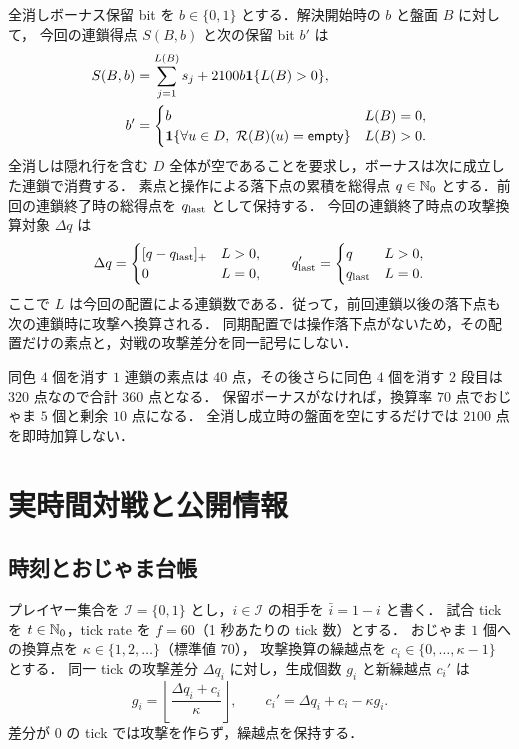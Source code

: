 全消しボーナス保留 bit を $b\in\{0,1\}$ とする．解決開始時の $b$ と盤面 $B$ に対して，
今回の連鎖得点 $S(B,b)$ と次の保留 bit $b'$ は
\begin{align}
 S(B,b)&=\sum_{j=1}^{L(B)}s_j+2100b\mathbf{1}\{L(B)>0\},\label{eq:allclear-score}\\
 b'&=\begin{cases}
 b&L(B)=0,\\
 \mathbf{1}\{\forall u\in D,\ \mathcal R(B)(u)=\mathsf{empty}\}&L(B)>0.
 \end{cases}\label{eq:allclear-bit}
\end{align}
全消しは隠れ行を含む $D$ 全体が空であることを要求し，ボーナスは次に成立した連鎖で消費する．
素点と操作による落下点の累積を総得点 $q\in\mathbb{N}_0$ とする．前回の連鎖終了時の総得点を $q_{\rm last}$ として保持する．
今回の連鎖終了時点の攻撃換算対象 $\Delta q$ は
\begin{equation}\label{eq:attackscore}
 \Delta q=\begin{cases}[q-q_{\rm last}]_+&L>0,\\0&L=0,\end{cases}
 \qquad q'_{\rm last}=\begin{cases}q&L>0,\\q_{\rm last}&L=0.\end{cases}
\end{equation}
ここで $L$ は今回の配置による連鎖数である．従って，前回連鎖以後の落下点も次の連鎖時に攻撃へ換算される．
同期配置では操作落下点がないため，その配置だけの素点と，対戦の攻撃差分を同一記号にしない．

\begin{example}[数値の区別]\label{ex:score}
同色 $4$ 個を消す $1$ 連鎖の素点は $40$ 点，その後さらに同色 $4$ 個を消す $2$ 段目は $320$ 点なので合計 $360$ 点となる．
保留ボーナスがなければ，換算率 $70$ 点でおじゃま $5$ 個と剰余 $10$ 点になる．
全消し成立時の盤面を空にするだけでは $2100$ 点を即時加算しない．
\end{example}

\section{実時間対戦と公開情報}\label{sec:versus}
\subsection{時刻とおじゃま台帳}
プレイヤー集合を $\mathcal I=\{0,1\}$ とし，$i\in\mathcal I$ の相手を $\bar i=1-i$ と書く．
試合 tick を $t\in\mathbb{N}_0$，tick rate を $f=60$（1 秒あたりの tick 数）とする．
おじゃま $1$ 個への換算点を $\kappa\in\{1,2,\ldots\}$（標準値 $70$），
攻撃換算の繰越点を $c_i\in\{0,\ldots,\kappa-1\}$ とする．
同一 tick の攻撃差分 $\Delta q_i$ に対し，生成個数 $g_i$ と新繰越点 $c_i'$ は
\begin{equation}\label{eq:carry}
 g_i=\left\lfloor\frac{\Delta q_i+c_i}{\kappa}\right\rfloor,
 \qquad c_i'=\Delta q_i+c_i-\kappa g_i.
\end{equation}
差分が $0$ の tick では攻撃を作らず，繰越点を保持する．

